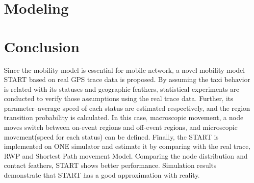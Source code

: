 \documentclass[twocolumn,10pt]{IEEEtran}
\begin{document}






\section{Modeling}
\label{section_modeling}








\section{Conclusion}
\label{section_conclusion}
Since the mobility model is essential for mobile network, a novel mobility model START based on real GPS trace data is proposed. By assuming the taxi behavior is related with its statuses and geographic feathers, statistical experiments are conducted to verify those assumptions using the real trace data. Further, its parameter--average speed of each status are estimated respectively, and the region transition probability is calculated. In this case, macroscopic movement, a node moves switch between on-event regions and off-event regions, and microscopic movement(speed for each status) can be defined. Finally, the START is implemented on ONE simulator and estimate it by comparing with the real trace, RWP and Shortest Path movement Model.
Comparing the node distribution and contact feathers, START shows better performance.
Simulation results demonstrate that START has a good approximation with reality.






\end{document}
